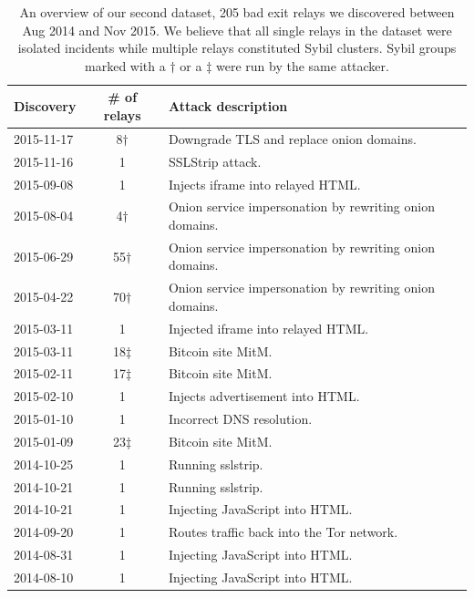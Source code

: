 \begin{table}[t]
\centering
\begin{tabular}{l c p{4cm}}
\textbf{Discovery} & \textbf{\# of relays} & \textbf{Attack description} \\
\hline
2015-11-17 & 8$\dagger$ & Downgrade TLS and replace onion domains. \\
2015-11-16 & 1 & SSLStrip attack. \\
2015-09-08 & 1 & Injects iframe into relayed HTML. \\
2015-08-04 & 4$\dagger$ & Onion service impersonation by rewriting onion domains. \\
2015-06-29 & 55$\dagger$ & Onion service impersonation by rewriting onion domains. \\
2015-04-22 & 70$\dagger$ & Onion service impersonation by rewriting onion domains. \\
2015-03-11 & 1 & Injected iframe into relayed HTML. \\
2015-03-11 & 18$\ddagger$ & Bitcoin site MitM. \\
2015-02-11 & 17$\ddagger$ & Bitcoin site MitM. \\
2015-02-10 & 1 & Injects advertisement into HTML. \\
2015-01-10 & 1 & Incorrect DNS resolution. \\
2015-01-09 & 23$\ddagger$ & Bitcoin site MitM. \\
2014-10-25 & 1 & Running sslstrip. \\
2014-10-21 & 1 & Running sslstrip. \\
2014-10-21 & 1 & Injecting JavaScript into HTML. \\
2014-09-20 & 1 & Routes traffic back into the Tor network. \\
2014-08-31 & 1 & Injecting JavaScript into HTML. \\
2014-08-10 & 1 & Injecting JavaScript into HTML. \\
\end{tabular}
\caption{An overview of our second dataset, 205 bad exit relays we discovered
	between Aug 2014 and Nov 2015.  We believe that all single relays in
	the dataset were isolated incidents while multiple relays constituted Sybil
	clusters.  Sybil groups marked with a $\dagger$ or a $\ddagger$ were run by
	the same attacker.}
\label{tab:exitmap-dataset}
\end{table}

